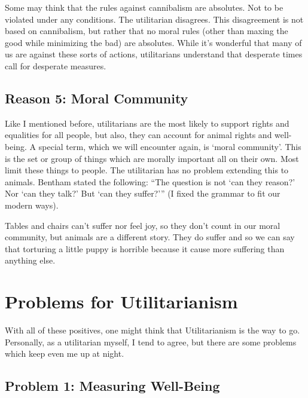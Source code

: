 Some may think that the rules against cannibalism are absolutes. Not to be violated under any conditions. The utilitarian disagrees. This disagreement is not based on cannibalism, but rather that no moral rules (other than maxing the good while minimizing the bad) are absolutes. While it’s wonderful that many of us are against these sorts of actions, utilitarians understand that desperate times call for desperate measures.

\subsection{Reason 5: Moral Community}

Like I mentioned before, utilitarians are the most likely to support rights and equalities for all people, but also, they can account for animal rights and well-being. A special term, which we will encounter again, is ‘moral community’. This is the set or group of things which are morally important all on their own. Most limit these things to people. The utilitarian has no problem extending this to animals. Bentham stated the following: “The question is not ‘can they reason?’ Nor ‘can they talk?’ But ‘can they suffer?’” (I fixed the grammar to fit our modern ways).

Tables and chairs can’t suffer nor feel joy, so they don’t count in our moral community, but animals are a different story. They do suffer and so we can say that torturing a little puppy is horrible because it cause more suffering than anything else.

\section{Problems for Utilitarianism}
With all of these positives, one might think that Utilitarianism is the way to go. Personally, as a utilitarian myself, I tend to agree, but there are some problems which keep even me up at night.
\subsection{Problem 1: Measuring Well-Being}

